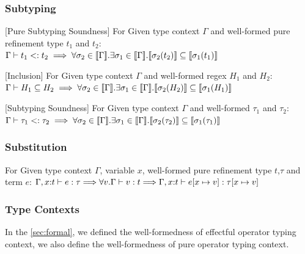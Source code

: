 \subsubsection{Subtyping}

\begin{lemma}\label{lemma:pure-subtyping}[Pure Subtyping Soundness] For Given type context $\Gamma$ and well-formed pure refinement type $t_1$ and $t_2$:
  $\Gamma \vdash t_1 <: t_2 \implies \forall \sigma_2 \in \llbracket {\Gamma} \rrbracket.\exists \sigma_1 \in \llbracket {\Gamma} \rrbracket. \llbracket {\sigma_2(t_2)} \rrbracket \subseteq \llbracket {\sigma_1(t_1)} \rrbracket$
\end{lemma}

\begin{lemma}\label{lemma:inclusion}[Inclusion] For Given type context $\Gamma$ and well-formed regex $H_1$ and $H_2$:
  $\Gamma \vdash H_1 \subseteq H_2 \implies \forall \sigma_2 \in \llbracket {\Gamma} \rrbracket.\exists \sigma_1 \in \llbracket {\Gamma} \rrbracket. \llbracket {\sigma_2(H_2)} \rrbracket \subseteq \llbracket {\sigma_1(H_1)} \rrbracket$
\end{lemma}

\begin{lemma}\label{lemma:subtyping}[Subtyping Soundness] For Given type context $\Gamma$ and well-formed \PAT $\tau_1$ and $\tau_2$:
  $\Gamma \vdash \tau_1 <: \tau_2 \implies \forall \sigma_2 \in \llbracket {\Gamma} \rrbracket.\exists \sigma_1 \in \llbracket {\Gamma} \rrbracket. \llbracket {\sigma_2(\tau_2)} \rrbracket \subseteq \llbracket {\sigma_1(\tau_1)} \rrbracket$
\end{lemma}

\subsubsection{Substitution}

\begin{lemma}\label{lemma:subt} For Given type context $\Gamma$, variable $x$, well-formed pure refinement type $t$,\PAT $\tau$ and term $e$:
  $\Gamma, x{:}t \vdash e : \tau {\implies} \forall v. \Gamma \vdash v : t {\implies} \Gamma, x{:}t \vdash e[x\mapsto v] : \tau[x\mapsto v]$
\end{lemma}

\subsubsection{Type Contexts}

In the \autoref{sec:formal}, we defined the well-formedness of effectful operator typing context, we also define the well-formedness of pure operator typing context.

